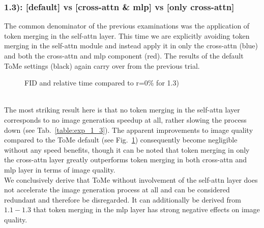 \subsubsection*{1.3): [default] vs [cross-attn \& mlp] vs [only cross-attn]}
The common denominator of the previous examinations was the application of token merging in the self-attn layer. This time we are explicitly avoiding token merging in the self-attn module and instead apply it in only the cross-attn (blue) and both the cross-attn and mlp component (red).
The results of the default ToMe settings (black) again carry over from the previous trial.\\
\begin{figure}[!htb]
    
    
\caption{FID and relative time compared to r=0\% for 1.3)}
\label{fig:exp_1_3}
\end{figure}\\
The most striking result here is that no token merging in the self-attn layer corresponds to no image generation speedup at all, rather slowing the process down (see Tab.~\ref{table:exp_1_3}). 
The apparent improvements to image quality compared to the ToMe default (see Fig.~\ref{fig:exp_1_3}) consequently become negligible without any speed benefits, though it can be noted that token merging in only the cross-attn layer greatly outperforms token merging in both cross-attn and mlp layer in terms of image quality.\\
We conclusively derive that ToMe without involvement of the self-attn layer does not accelerate the image generation process at all and can be considered redundant and therefore be disregarded. It can additionally be derived from \(1.1 - 1.3\) that token merging in the mlp layer has strong negative effects on image quality.




